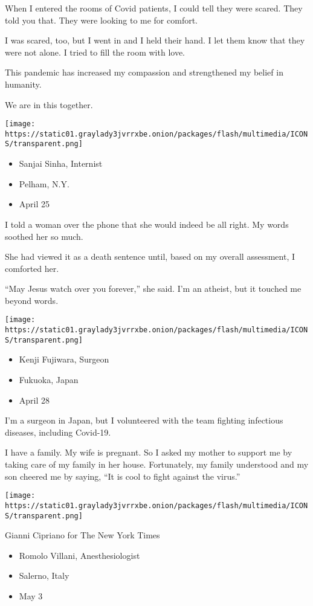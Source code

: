 When I entered the rooms of Covid patients, I could tell they were
scared. They told you that. They were looking to me for comfort.

I was scared, too, but I went in and I held their hand. I let them know
that they were not alone. I tried to fill the room with love.

This pandemic has increased my compassion and strengthened my belief in
humanity.

We are in this together.

\texttt{[image: https://static01.graylady3jvrrxbe.onion/packages/flash/multimedia/ICONS/transparent.png]}

\begin{itemize}
\tightlist
\item
  Sanjai Sinha, Internist
\item
  Pelham, N.Y.
\item
  April 25
\end{itemize}

I told a woman over the phone that she would indeed be all right. My
words soothed her so much.

She had viewed it as a death sentence until, based on my overall
assessment, I comforted her.

``May Jesus watch over you forever,'' she said. I'm an atheist, but it
touched me beyond words.

\texttt{[image: https://static01.graylady3jvrrxbe.onion/packages/flash/multimedia/ICONS/transparent.png]}

\begin{itemize}
\tightlist
\item
  Kenji Fujiwara, Surgeon
\item
  Fukuoka, Japan
\item
  April 28
\end{itemize}

I'm a surgeon in Japan, but I volunteered with the team fighting
infectious diseases, including Covid-19.

I have a family. My wife is pregnant. So I asked my mother to support me
by taking care of my family in her house. Fortunately, my family
understood and my son cheered me by saying, ``It is cool to fight
against the virus.''

\texttt{[image: https://static01.graylady3jvrrxbe.onion/packages/flash/multimedia/ICONS/transparent.png]}

Gianni Cipriano for The New York Times

\begin{itemize}
\tightlist
\item
  Romolo Villani, Anesthesiologist
\item
  Salerno, Italy
\item
  May 3
\end{itemize}


